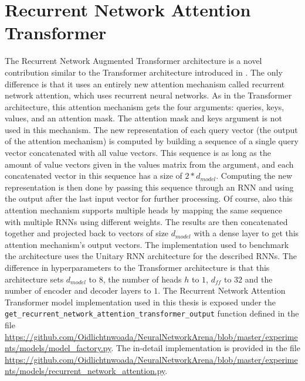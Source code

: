 \documentclass[draft,final]{vutinfth} %
\begin{document}
    \section{Recurrent Network Attention Transformer} \label{rnatt}
    The Recurrent Network Augmented Transformer architecture is a novel contribution similar to the Transformer architecture introduced in \cite{Transformer}.
    The only difference is that it uses an entirely new attention mechanism called recurrent network attention, which uses recurrent neural networks.
    As in the Transformer architecture, this attention mechanism gets the four arguments: queries, keys, values, and an attention mask.
    The attention mask and keys argument is not used in this mechanism.
    The new representation of each query vector (the output of the attention mechanism) is computed by building a sequence of a single query vector concatenated with all value vectors.
    This sequence is as long as the amount of value vectors given in the values matrix from the argument, and each concatenated vector in this sequence has a size of $2*d_{model}$.
    Computing the new representation is then done by passing this sequence through an RNN and using the output after the last input vector for further processing.
    Of course, also this attention mechanism supports multiple heads by mapping the same sequence with multiple RNNs using different weights.
    The results are then concatenated together and projected back to vectors of size $d_{model}$ with a dense layer to get this attention mechanism's output vectors.
    The implementation used to benchmark the architecture uses the Unitary RNN architecture for the described RNNs.
    The difference in hyperparameters to the Transformer architecture is that this architecture sets $d_{model}$ to $8$, the number of heads $h$ to $1$, $d_{ff}$ to $32$ and the number of encoder and decoder layers to $1$.
    The Recurrent Network Attention Transformer model implementation used in this thesis is exposed under the \texttt{get\_recurrent\_network\_attention\_transformer\_output} function defined in the file \url{https://github.com/Oidlichtnwoada/NeuralNetworkArena/blob/master/experiments/models/model_factory.py}.
    The in-detail implementation is provided in the file \url{https://github.com/Oidlichtnwoada/NeuralNetworkArena/blob/master/experiments/models/recurrent_network_attention.py}.
\end{document}
